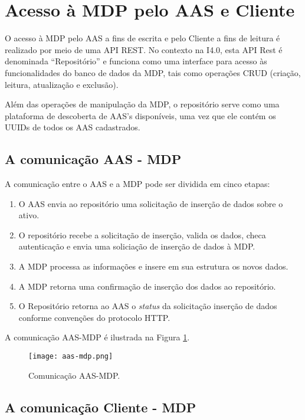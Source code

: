   \section{Acesso à MDP pelo AAS e Cliente}
	\label{comunicacao-CS}
	
	O acesso à MDP pelo AAS a fins de escrita e pelo Cliente a fins de leitura é realizado por meio de uma API REST. No contexto na I4.0, esta API Rest é denominada ``Repositório'' e funciona como uma interface para acesso às funcionalidades do banco de dados da MDP, tais como operações CRUD (criação, leitura, atualização e exclusão).
	
	Além das operações de manipulação da MDP, o repositório serve como uma plataforma de descoberta de AAS's disponíveis, uma vez que ele contém os UUIDs de todos os AAS cadastrados.
	
	
	\subsection{A comunicação AAS - MDP}
	
	A comunicação entre o AAS e a MDP pode ser dividida em cinco etapas:
	
	\begin{enumerate}
		\item O AAS envia ao repositório uma solicitação de inserção de dados sobre o ativo.
		\item O repositório recebe a solicitação de inserção, valida os dados, checa autenticação e envia uma soliciação de inserção de dados à MDP.
		\item A MDP processa as informações e insere em sua estrutura os novos dados.
		\item A MDP retorna uma confirmação de inserção dos dados ao repositório.
		\item O Repositório retorna ao AAS o \textit{status} da solicitação inserção de dados conforme convenções do protocolo HTTP.
	\end{enumerate}
	
	
	A comunicação AAS-MDP é ilustrada na Figura \ref{fig:aas-mdp}.
	
	
	\begin{figure}[hbt!]
		\centering
		\caption{Comunicação AAS-MDP.}
		\texttt{[image: aas-mdp.png]}
		\label{fig:aas-mdp}
	\end{figure}

	
	\subsection{A comunicação Cliente - MDP}
	
